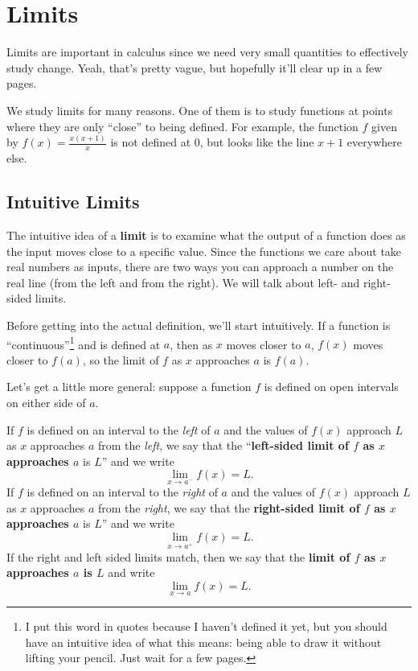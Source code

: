 \section{Limits}

Limits are important in calculus since we need very small quantities to effectively study change. Yeah, that's pretty vague, but hopefully it'll clear up in a few pages.

We study limits for many reasons. One of them is to study functions at points where they are only ``close'' to being defined. For example, the function $f$ given by $f(x)=\frac{x(x+1)}{x}$ is not defined at $0$, but looks like the line $x+1$ everywhere else.

\subsection{Intuitive Limits}

The intuitive idea of a \textbf{limit} is to examine what the output of a function does as the input moves close to a specific value. Since the functions we care about take real numbers as inputs, there are two ways you can approach a number on the real line (from the left and from the right). We will talk about left- and right-sided limits.

Before getting into the actual definition, we'll start intuitively. If a function is     ``continuous''\footnote{I put this word in quotes because I haven't defined it yet, but you should have an intuitive idea of what this means: being able to draw it without lifting your pencil. Just wait for a few pages.} and is defined at $a$, then as $x$ moves closer to $a$, $f(x)$ moves closer to $f(a)$, so the limit of $f$ as $x$ approaches $a$ is $f(a)$.


Let's get a little more general: suppose a function $f$ is defined on open intervals on either side of $a$.

If $f$ is defined on an interval to the \textit{left} of $a$ and the values of $f(x)$ approach $L$ as $x$ approaches $a$ from the \textit{left}, we say that the ``\textbf{left-sided limit of $f$ as $x$ approaches $a$} is $L$'' and we write $$\lim_{x\to a^-}f(x)=L.$$
If $f$ is defined on an interval to the \textit{right} of $a$ and the values of $f(x)$ approach $L$ as $x$ approaches $a$ from the \textit{right}, we say that the \textbf{right-sided limit of $f$ as $x$ approaches $a$} is $L$'' and we write
$$\lim_{x\to a^+}f(x)=L.$$
If the right and left sided limits match, then we say that the \textbf{limit of $f$ as $x$ approaches $a$ is $L$} and write $$\lim_{x\to a}f(x)=L.$$

